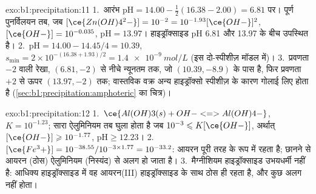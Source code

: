 \begin{solution}{exo:b1:precipitation:11}
1.~आरंभ $\mathrm{pH} = 14.00 - \frac12(16.38 - 2.00) = 6.81$ पर। पूर्ण
पुनर्विलयन तब, जब $[\ce{Zn(OH)4^2-}] = 10^{-2} = 10^{-1.93}[\ce{OH-}]^2$,
$[\ce{OH-}] = 10^{-0.035}$, $\mathrm{pH} = 13.97$। हाइड्रॉक्साइड
pH 6.81 और 13.97 के बीच उपस्थित है।
2.~$\mathrm{pH} = 14.00 - 14.45/4 = 10.39$, $s_{\min} = 2 \times
10^{-(16.38 + 1.93)/2} = \qty{1.4e-9}{mol/L}$ (इस दो-स्पीशीज़ मॉडल में)।
3.~प्रवणता $-2$ वाली रेखा, $(6.81, -2)$ से नीचे न्यूनतम तक, जो
$(10.39, -8.9)$ के पास है, फिर प्रवणता $+2$ से ऊपर $(13.97, -2)$ तक; वास्तविक वक्र
अन्य हाइड्रॉक्सो स्पीशीज़ के कारण गोलाई लिए होता है
(\cref{sec:b1:precipitation:amphoteric} का चित्र)।
\end{solution}

\begin{solution}{exo:b1:precipitation:12}
1.~$\ce{Al(OH)3(s) + OH- <=> Al(OH)4-}$, $K = 10^{-1.23}$; सारा
ऐलुमिनियम तब घुला होता है जब $10^{-3} \leqslant K[\ce{OH-}]$, अर्थात्
$[\ce{OH-}] \geqslant 10^{-1.77}$, $\mathrm{pH} \geqslant 12.23$।
2.~$[\ce{Fe^3+}] = 10^{-38.55}/10^{-3 \times 1.77} = 10^{-33.2}$: आयरन
पूरी तरह  के रूप में रहता है; छानने से आयरन (ठोस)
ऐलुमिनियम (निस्यंद) से अलग हो जाता है।
3.~मैग्नीशियम हाइड्रॉक्साइड उभयधर्मी नहीं है: आधिक्य हाइड्रॉक्साइड में वह
आयरन(III) हाइड्रॉक्साइड के साथ ठोस ही रहता है, और कुछ अलग नहीं होता।
\end{solution}

